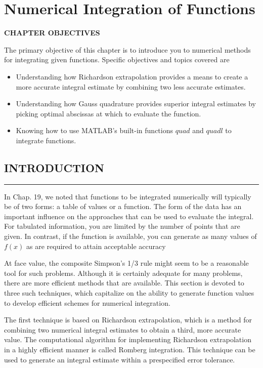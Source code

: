 \documentclass[../main.tex]{subfiles}
\begin{document}
\chapter*{Numerical Integration of Functions}

\begin{center}\begin{Large}\textbf{CHAPTER OBJECTIVES}\end{Large}\end{center}

The primary objective of this chapter is to introduce you to numerical methods for
integrating given functions. Specific objectives and topics covered are
\begin{itemize}
\item Understanding how Richardson extrapolation provides a means to create a more
accurate integral estimate by combining two less accurate estimates.
\item Understanding how Gauss quadrature provides superior integral estimates by
picking optimal abscissas at which to evaluate the function.
\item Knowing how to use MATLAB's built-in functions $quad$ and 
$quadl$ to integrate
functions.
\end{itemize}
\vspace{0,6in}
\section{INTRODUCTION}
\vspace{0,1in}
\hrule
\vspace{0,1in}
In Chap. 19, we noted that functions to be integrated numerically will typically be of two
forms: a table of values or a function. The form of the data has an important influence on
the approaches that can be used to evaluate the integral. For tabulated information, you are
limited by the number of points that are given. In contrast, if the function is available, you
can generate as many values of $f (x)$ as are required to attain acceptable accuracy

At face value, the composite Simpson's 1/3 rule might seem to be a reasonable tool for
such problems. Although it is certainly adequate for many problems, there are more efficient methods that are available. This section is devoted to three such techniques, which
capitalize on the ability to generate function values to develop efficient schemes for
numerical integration.

The first technique is based on Richardson extrapolation, which is a method for
combining two numerical integral estimates to obtain a third, more accurate value. The
computational algorithm for implementing Richardson extrapolation in a highly efficient
manner is called Romberg integration. This technique can be used to generate an integral
estimate within a prespecified error tolerance.
\end{document}
